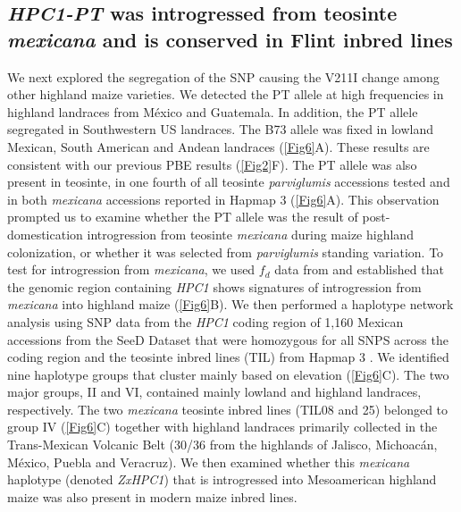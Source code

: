 \documentclass[9pt,twocolumn,twoside,lineno]{biorxiv}
\newcommand{\mex}{\textit{mexicana}\xspace}
\newcommand{\hpc}{\textit{HPC1}\xspace}
\newcommand{\parv}{\textit{parviglumis}\xspace}
\begin{document}
\subsection{\textit{HPC1-PT} was introgressed from teosinte \mex and is conserved in Flint inbred lines}
We next explored the segregation of the SNP causing the V211I change among other highland maize varieties.
We detected the PT allele at high frequencies in highland landraces from M\'exico and Guatemala. 
In addition, the PT allele segregated in Southwestern US landraces. 
The B73 allele was fixed in lowland Mexican, South American and Andean landraces (\cref{Fig6}A). 
These results are consistent with our previous PBE results (\cref{Fig2}F).
The PT allele was also present in teosinte, in one fourth of all teosinte \parv accessions tested and in both \mex accessions reported in Hapmap 3 \cite{Bukowski2017-ng} (\cref{Fig6}A). 
This observation prompted us to examine whether the PT allele was the result of post-domestication introgression from teosinte \mex during maize highland colonization, or whether it was selected from \parv standing variation.
To test for introgression from \mex, we used \(f_d\) data from \cite{Gonzalez-Segovia2019-jy} and established that the genomic region containing \hpc shows signatures of introgression from \mex into highland maize (\cref{Fig6}B).
We then performed a haplotype network analysis using SNP data from the \hpc coding region of 1,160 Mexican accessions from the SeeD Dataset \cite{Romero_Navarro2017-cn} that were homozygous for all SNPS across the coding region and the teosinte inbred lines (TIL) from Hapmap 3 \cite{Bukowski2017-ng}.   
We identified nine haplotype groups that cluster mainly based on elevation (\cref{Fig6}C). 
The two major groups, II and VI, contained mainly lowland and highland landraces, respectively. 
The two \mex teosinte inbred lines (TIL08 and 25) belonged to group IV  (\cref{Fig6}C) together with highland landraces primarily collected in the Trans-Mexican Volcanic Belt (30/36 from the highlands of Jalisco, Michoacán, M\'exico, Puebla and Veracruz).
We then examined whether this \mex haplotype (denoted \textit{ZxHPC1}) that is introgressed into Mesoamerican highland maize was also present in modern maize inbred lines. 
\end{document}
